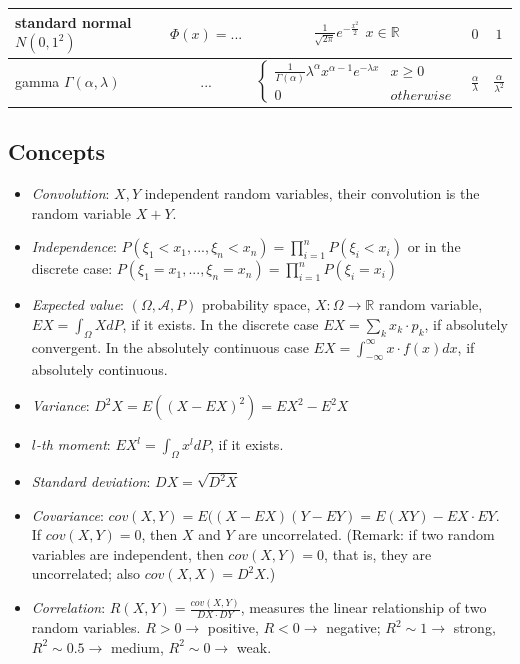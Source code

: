 \documentclass[margin=0px]{article}
\begin{document}
\begin{tabular}{|p{3cm}|c|c|c|c|}
    \hline standard normal \newline $N(0,1^2)$ & $\Phi(x)=...$                              & $\frac{1}{\sqrt{2 \pi}}e^{-\frac{x^2}{2}}$ $x \in \mathbb{R}$                   & $0$           & $1$               \\
    \hline gamma \newline $\Gamma(\alpha,\lambda)$
                                                 & $...$
                                                 & $\left\{\begin{array} {lr}
            \frac{1}{\Gamma(\alpha)}\lambda^{\alpha}x^{\alpha-1}e^{-\lambda x} & x \geq 0  \\
            0                                                                  & otherwise
        \end{array}\right.$
                                                 & $\frac{\alpha}{\lambda}$
                                                 & $\frac{\alpha}{\lambda^2}$                                                                                                                                       \\
    \hline
\end{tabular}

\subsection{Concepts}

\begin{itemize}
    \item \textit{Convolution}: $X,Y$ independent random variables, their convolution is the random variable $X+Y$.
    \item \textit{Independence}: $P(\xi_1<x_1, ..., \xi_n<x_n) = \prod_{i=1}^{n}{P(\xi_i<x_i)}$ or in the discrete case: $P(\xi_1=x_1, ..., \xi_n=x_n) = \prod_{i=1}^{n}{P(\xi_i=x_i)}$
    \item \textit{Expected value}: $(\Omega, \mathcal{A}, P)$ probability space, $X:\Omega \to \mathbb{R}$ random variable, $EX = \int_{\Omega}{XdP}$, if it exists. In the discrete case $EX = \sum_{k}{x_k \cdot p_k}$, if absolutely convergent. In the absolutely continuous case $EX = \int_{-\infty}^{\infty}{x \cdot f(x)dx}$, if absolutely continuous.
    \item \textit{Variance}: $D^{2}X = E((X-EX)^2) = EX^2-E^{2}X$
    \item \textit{$l$-th moment}: $EX^l = \int_{\Omega}{x^{l}dP}$, if it exists.
    \item \textit{Standard deviation}: $DX = \sqrt{D^{2}X}$
    \item \textit{Covariance}: $cov(X,Y) = E((X-EX)(Y-EY) = E(XY) - EX \cdot EY$. If $cov(X,Y) = 0$, then $X$ and $Y$ are uncorrelated. (Remark: if two random variables are independent, then $cov(X,Y) = 0$, that is, they are uncorrelated; also $cov(X,X) = D^{2}X$.)
    \item \textit{Correlation}: $R(X,Y) = \frac{cov(X,Y)}{DX \cdot DY}$, measures the linear relationship of two random variables. $R>0 \to$ positive, $R<0 \to$ negative; $R^2 \sim 1 \to$ strong, $R^2 \sim 0.5 \to$ medium, $R^2 \sim 0 \to$ weak.
\end{itemize}
\end{document}
